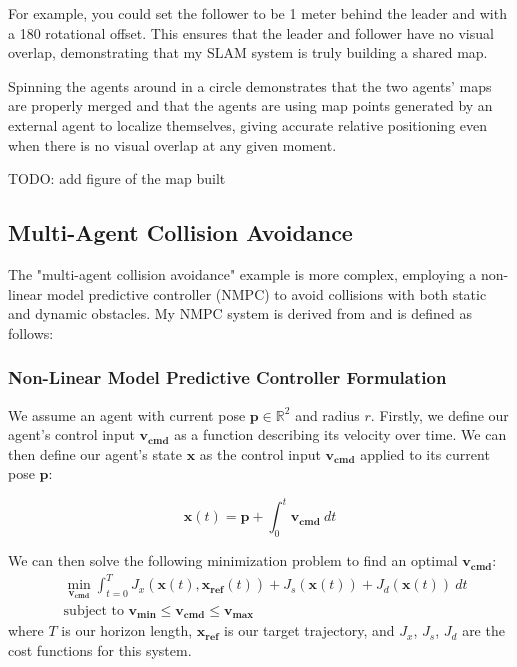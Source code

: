 For example, you could set the follower to be 1 meter behind the leader and with a 180\textdegree{} rotational offset. This ensures that the leader and follower have no visual overlap, demonstrating that my SLAM system is truly building a shared map.

Spinning the agents around in a circle demonstrates that the two agents' maps are properly merged and that the agents are using map points generated by an external agent to localize themselves, giving accurate relative positioning even when there is no visual overlap at any given moment.

TODO: add figure of the map built

\subsection{Multi-Agent Collision Avoidance}
\label{sec:multi-agent-collision-avoidance}
The "multi-agent collision avoidance" example is more complex, employing a non-linear model predictive controller (NMPC) to avoid collisions with both static and dynamic obstacles. My NMPC system is derived from \autocite{DBLP:journals/corr/KamelASN17} and is defined as follows:

\subsubsection{Non-Linear Model Predictive Controller Formulation}
\label{sec:nmpc-implementation-details}
We assume an agent with current pose $\bm{p} \in \mathbb{R}^2$ and radius $r$. Firstly, we define our agent's control input $\bm{v_{cmd}}$ as a function describing its velocity over time. We can then define our agent's state $\bm{x}$ as the control input $\bm{v_{cmd}}$ applied to its current pose $\bm{p}$:

\begin{equation}
    \bm{x}(t) = \bm{p} + \int_{0}^{t} \bm{v_{cmd}}\ dt
\end{equation}

We can then solve the following minimization problem to find an optimal $\bm{v_{cmd}}$:
\begin{equation}
    \begin{aligned} \label{eq:nmpc-minimization-problem}
         & \min_{\bm{v_{cmd}}} \int_{t=0}^{T} J_x(\bm{x}(t), \bm{x_{ref}}(t)) + J_s(\bm{x}(t)) + J_d(\bm{x}(t))\ dt \\
         & \text{subject to } \bm{v_{min}} \leq \bm{v_{cmd}} \leq \bm{v_{max}}
    \end{aligned}
\end{equation}
where $T$ is our horizon length, $\bm{x_{ref}}$ is our target trajectory, and $J_x$, $J_s$, $J_d$ are the cost functions for this system.

